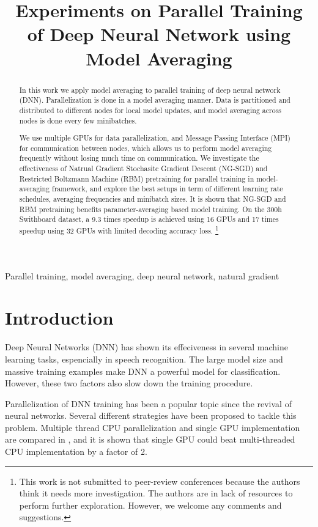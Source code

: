 \documentclass{article}
\title{Experiments on Parallel Training of Deep Neural Network using Model Averaging}
\begin{document}
%
\maketitle
%
\begin{abstract}
In this work we apply model averaging to parallel training of deep neural network (DNN). 
Parallelization is done in a model averaging manner. Data is partitioned and distributed to different nodes for 
local model updates, and model averaging across nodes is done every few minibatches. 

We use multiple GPUs for data parallelization, and Message Passing Interface (MPI) for communication between nodes,
which allows us to perform model averaging frequently without losing much time on communication.
We investigate the effectiveness of Natrual Gradient Stochasitc Gradient Descent (NG-SGD) and Restricted Boltzmann 
Machine (RBM) pretraining for parallel training in model-averaging framework, and explore the best setups in 
term of different learning rate schedules, averaging frequencies and minibatch sizes. It is shown that NG-SGD 
and RBM pretraining benefits parameter-averaging based model training. On the 300h Swithboard dataset, a 9.3 times 
speedup is achieved using 16 GPUs and 17 times speedup using 32 GPUs with limited decoding accuracy loss. 
\footnote{This work is not submitted to 
peer-review conferences because the authors think it needs more investigation. The authors are in lack of 
resources to perform further exploration. However, we welcome any comments and suggestions.}
\end{abstract}
%
\begin{keywords}
Parallel training, model averaging, deep neural network, natural gradient
\end{keywords}
%
\section{Introduction}
\label{sec:intro}
Deep Neural Networks (DNN) has shown its effeciveness in several machine learning tasks, espencially in speech
recognition. The large model size and massive training examples make DNN a powerful model for classification. However,
these two factors also slow down the training procedure.

Parallelization of DNN training has been a popular topic since the revival of neural networks. Several different strategies
have been proposed to tackle this problem. Multiple thread CPU parallelization and single GPU implementation are compared
in \cite{scanzio2010parallel,vesely2010parallel}, and it is shown that single GPU could beat multi-threaded CPU implementation
by a factor of 2.
\end{document}
